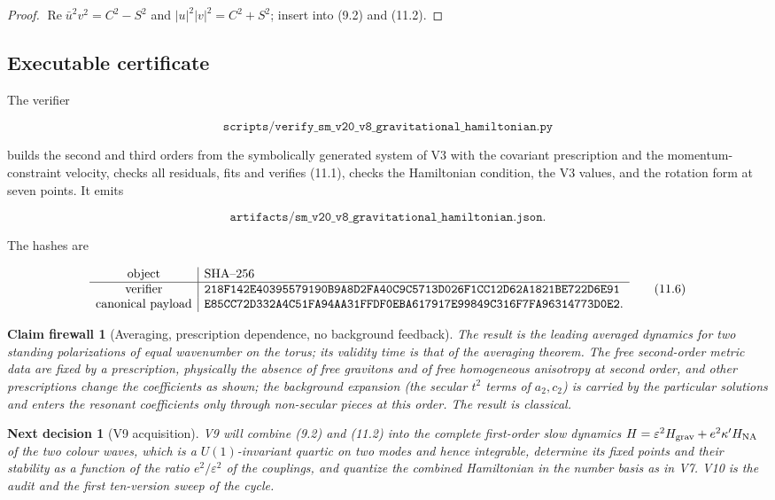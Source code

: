 \documentclass[11pt]{article}
\newtheorem{firewall}[theorem]{Claim firewall}
\newtheorem{decision}[theorem]{Next decision}
\theoremstyle{remark}
\begin{document}
\begin{proof}
\(\operatorname{Re}\bar u^2v^2=C^2-S^2\) and \(|u|^2|v|^2=C^2+S^2\);
insert into (9.2) and (11.2).
\end{proof}

\subsection{Executable certificate}

The verifier

\[
 \texttt{scripts/verify\_sm\_v20\_v8\_gravitational\_hamiltonian.py}  \tag{11.4}
\]

builds the second and third orders from the symbolically generated
system of V3 with the covariant prescription and the
momentum-constraint velocity, checks all residuals, fits and
verifies (11.1), checks the Hamiltonian condition, the V3 values, and
the rotation form at seven points.  It emits

\[
 \texttt{artifacts/sm\_v20\_v8\_gravitational\_hamiltonian.json}.     \tag{11.5}
\]

The hashes are

\[
\begin{array}{c|l}
\hbox{object}&\hbox{SHA--256}\\ \hline
\hbox{verifier}&
\texttt{218F142E40395579190B9A8D2FA40C9C5713D026F1CC12D62A1821BE722D6E91}\\
\hbox{canonical payload}&
\texttt{E85CC72D332A4C51FA94AA31FFDF0EBA617917E99849C316F7FA96314773D0E2}.
\end{array}                                                     \tag{11.6}
\]

\begin{firewall}[Averaging, prescription dependence, no background feedback]
\label{fire:v20v8}
The result is the leading averaged dynamics for two standing
polarizations of equal wavenumber on the torus; its validity time is
that of the averaging theorem.  The free second-order metric data are
fixed by a prescription, physically the absence of free gravitons
and of free homogeneous anisotropy at second order, and other
prescriptions change the coefficients as shown; the background
expansion (the secular \(t^2\) terms of \(a_2,c_2\)) is carried by the
particular solutions and enters the resonant coefficients only through
non-secular pieces at this order.  The result is classical.
\end{firewall}

\begin{decision}[V9 acquisition]
\label{dec:v20v8-next}
V9 will combine (9.2) and (11.2) into the complete first-order slow
dynamics \(H=\varepsilon^2H_{\rm grav}+e^2\kappa'H_{\rm NA}\) of the two
colour waves, which is a \(U(1)\)-invariant quartic on two modes and
hence integrable, determine its fixed points and their stability as a
function of the ratio \(e^2/\varepsilon^2\) of the couplings, and
quantize the combined Hamiltonian in the number basis as in V7.  V10
is the audit and the first ten-version sweep of the cycle.
\end{decision}
\end{document}
